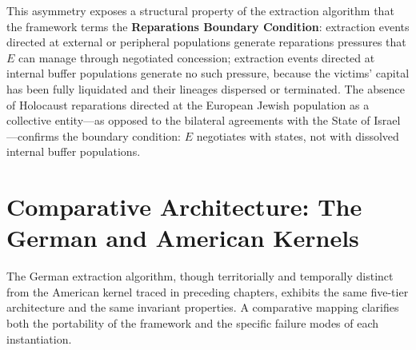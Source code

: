 This asymmetry exposes a structural property of the extraction algorithm that the framework terms the \textbf{Reparations Boundary Condition}: extraction events directed at external or peripheral populations generate reparations pressures that $E$ can manage through negotiated concession; extraction events directed at internal buffer populations generate no such pressure, because the victims' capital has been fully liquidated and their lineages dispersed or terminated. The absence of Holocaust reparations directed at the European Jewish population as a collective entity---as opposed to the bilateral agreements with the State of Israel---confirms the boundary condition: $E$ negotiates with states, not with dissolved internal buffer populations.

\section{Comparative Architecture: The German and American Kernels}
\label{sec:comparative}

The German extraction algorithm, though territorially and temporally distinct from the American kernel traced in preceding chapters, exhibits the same five-tier architecture and the same invariant properties. A comparative mapping clarifies both the portability of the framework and the specific failure modes of each instantiation.

